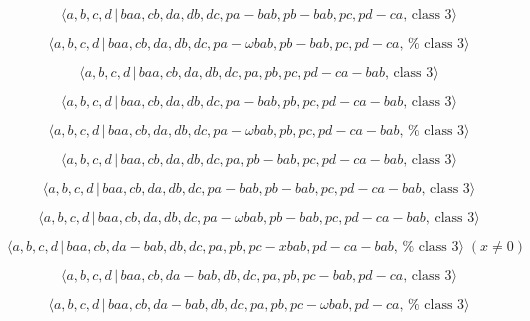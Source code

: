 \documentclass[10pt]{article}
\begin{document}
\begin{equation}
\langle a,b,c,d\,|\,baa,cb,da,db,dc,pa-bab,pb-bab,pc,pd-ca,\,\text{class }%
3\rangle  \tag{7.4001}
\end{equation}

\begin{equation}
\langle a,b,c,d\,|\,baa,cb,da,db,dc,pa-\omega bab,pb-bab,pc,pd-ca,\,\text{%
class }3\rangle  \tag{7.4002}
\end{equation}

\begin{equation}
\langle a,b,c,d\,|\,baa,cb,da,db,dc,pa,pb,pc,pd-ca-bab,\,\text{class }%
3\rangle  \tag{7.4003}
\end{equation}

\begin{equation}
\langle a,b,c,d\,|\,baa,cb,da,db,dc,pa-bab,pb,pc,pd-ca-bab,\,\text{class }%
3\rangle  \tag{7.4004}
\end{equation}

\begin{equation}
\langle a,b,c,d\,|\,baa,cb,da,db,dc,pa-\omega bab,pb,pc,pd-ca-bab,\,\text{%
class }3\rangle  \tag{7.4005}
\end{equation}

\begin{equation}
\langle a,b,c,d\,|\,baa,cb,da,db,dc,pa,pb-bab,pc,pd-ca-bab,\,\text{class }%
3\rangle  \tag{7.4006}
\end{equation}

\begin{equation}
\langle a,b,c,d\,|\,baa,cb,da,db,dc,pa-bab,pb-bab,pc,pd-ca-bab,\,\text{class 
}3\rangle  \tag{7.4007}
\end{equation}

\begin{equation}
\langle a,b,c,d\,|\,baa,cb,da,db,dc,pa-\omega bab,pb-bab,pc,pd-ca-bab,\,%
\text{class }3\rangle  \tag{7.4008}
\end{equation}

\begin{equation}
\langle a,b,c,d\,|\,baa,cb,da-bab,db,dc,pa,pb,pc-xbab,pd-ca-bab,\,\text{%
class }3\rangle \;(x \neq 0)  \tag{7.4009}
\end{equation}

\begin{equation}
\langle a,b,c,d\,|\,baa,cb,da-bab,db,dc,pa,pb,pc-bab,pd-ca,\,\text{class }%
3\rangle  \tag{7.4010}
\end{equation}

\begin{equation}
\langle a,b,c,d\,|\,baa,cb,da-bab,db,dc,pa,pb,pc-\omega bab,pd-ca,\,\text{%
class }3\rangle  \tag{7.4011}
\end{equation}
\end{document}
